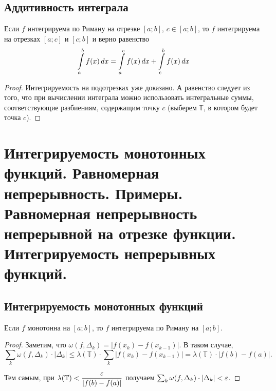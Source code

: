 \documentclass[a4paper]{article}
\theoremstyle{named}
\newcommand{\T}{\mathbb{T}}
\renewcommand{\int}{\intop}
\begin{document}
        \subsection{Аддитивность интеграла}

        \begin{consequence*}
            Если $f$ интегрируема по Риману на отрезке $[a; b]$, $c \in [a; b]$, то $f$ интегрируема на отрезках $[a; c]$ и $[c; b]$ и верно равенство
            \begin{equation*}
                \int_a^b f(x) \dd x = \int_a^c f(x) \dd x + \int_c^b f(x) \dd x
            \end{equation*}
        \end{consequence*}

        \begin{proof}
            Интегрируемость на подотрезках уже доказано. А равенство следует из того, что при вычислении интеграла можно использовать интегральные суммы, соответствующие разбиениям, содержащим точку $c$ (выберем $\T$, в котором будет точка $c$).
        \end{proof}

    \section{Интегрируемость монотонных функций. Равномерная непрерывность. Примеры. Равномерная непрерывность непрерывной на отрезке функции. Интегрируемость непрерывных функций.}

        \subsection{Интегрируемость монотонных функций}

        \begin{consequence*}
            Если $f$ монотонна на $[a; b]$, то $f$ интегрируема по Риману на $[a; b]$.
        \end{consequence*}

        \begin{proof}
            Заметим, что $\omega(f, \Delta_k) = |f(x_k) - f(x_{k - 1})|$. В таком случае,
            \begin{equation*}
                \sum_k \omega(f, \Delta_k) \cdot |\Delta_k| \leq \lambda(\T) \cdot \sum_k |f(x_k) - f(x_{k - 1})| = \lambda(\T) \cdot |f(b) - f(a)|.
            \end{equation*}

            Тем самым, при $\lambda(\T) < \dfrac{\eps}{|f(b) - f(a)|}$ получаем $\sum_k \omega(f, \Delta_k) \cdot |\Delta_k| < \varepsilon$.
        \end{proof}
\end{document}
